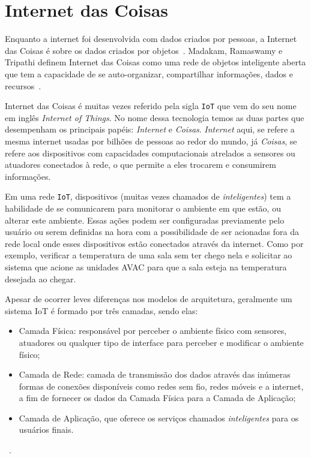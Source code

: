 \section{Internet das Coisas}

Enquanto a internet foi desenvolvida com dados criados por pessoas, 
a Internet das Coisas é sobre os dados criados por objetos~\cite{Nord2019}. 
Madakam, Ramaswamy e Tripathi definem Internet das Coisas como uma rede de objetos inteligente 
aberta que tem a capacidade de se auto-organizar, compartilhar informações, dados e 
recursos~\cite{Madakam2015}.

Internet das Coisas é muitas vezes referido pela sigla \verb'IoT' que vem do 
seu nome em inglês \textit{Internet of Things}. No nome dessa tecnologia temos as 
duas partes que desempenham os principais papéis: \emph{Internet} e \emph{Coisas}.
\emph{Internet} aqui, se refere a mesma internet usadas por bilhões de pessoas ao 
redor do mundo, já \emph{Coisas}, se refere aos dispositivos com capacidades computacionais 
atrelados a sensores ou atuadores conectados à rede, o que permite a eles trocarem e 
consumirem informações.

Em uma rede \verb'IoT', dispositivos (muitas vezes chamados de \emph{inteligentes}) tem a habilidade
de se comunicarem para monitorar o ambiente em que estão, ou alterar este ambiente. Essas ações 
podem ser configuradas previamente pelo usuário ou serem definidas na hora com a possibilidade de 
ser acionadas fora da rede local onde esses dispositivos estão conectados através da internet.
Como por exemplo, verificar a temperatura de uma sala sem ter chego nela e solicitar ao sistema que 
acione as unidades AVAC para que a sala esteja na temperatura desejada ao chegar.

Apesar de ocorrer leves diferenças nos modelos de arquitetura, 
geralmente um sistema IoT é formado por três camadas, sendo elas:

\begin{itemize}
    \item Camada Física: responsável por perceber o ambiente físico com sensores, 
    atuadores ou qualquer tipo de interface para perceber e modificar o ambiente físico;

    \item Camada de Rede: camada de transmissão dos dados através das inúmeras formas de conexões 
    disponíveis como redes sem fio, redes móveis e a internet, a fim de fornecer os dados da 
    Camada Física para a Camada de Aplicação;

    \item Camada de Aplicação, que oferece os serviços chamados \emph{inteligentes} para os usuários 
    finais.
\end{itemize}
~\cite{Yan2014}.

